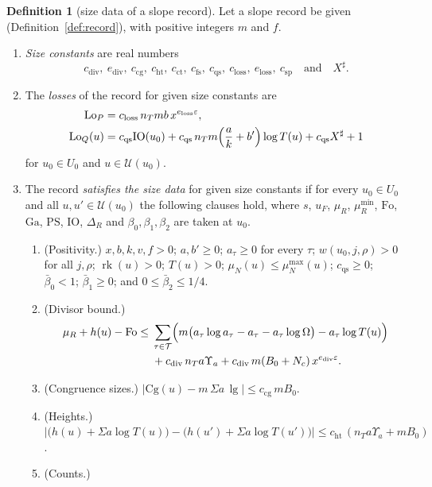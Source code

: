 \documentclass[11pt]{amsbook}
\theoremstyle{plain}
\theoremstyle{definition}
\newtheorem{definition}[theorem]{Definition}
\theoremstyle{remark}
\numberwithin{equation}{section}
\numberwithin{figure}{chapter}
\numberwithin{table}{chapter}
\newcommand{\eps}{\varepsilon}
\newcommand{\rk}{\operatorname{rk}}
\newcommand{\PS}{\mathrm{PS}}
\newcommand{\Top}{\mathcal{T}}
\newcommand{\Words}{\mathcal{U}}
\newcommand{\Cg}{\mathrm{Cg}}
\newcommand{\lgv}{\operatorname{lg}}
\newcommand{\Fo}{\mathrm{Fo}}
\newcommand{\Ga}{\mathrm{Ga}}
\newcommand{\IO}{\mathrm{IO}}
\newcommand{\Lo}{\mathrm{Lo}}
\begin{document}
\begin{definition}[size data of a slope record]\label{def:size-data}
Let a slope record be given (Definition~\ref{def:record}), with
positive integers $m$ and $f$.
\begin{enumerate}[label=(\arabic*)]
\item \emph{Size constants} are real numbers
\[
c_{\mathrm{div}},\ e_{\mathrm{div}},\ c_{\mathrm{cg}},\ c_{\mathrm{ht}},
\ c_{\mathrm{ct}},\ c_{\mathrm{fs}},\ c_{\mathrm{qs}},\
c_{\mathrm{loss}},\ e_{\mathrm{loss}},\ c_{\mathrm{sp}}\quad
\text{and}\quad X^\sharp.
\]
\item The \emph{losses} of the record for given size constants are
\[
\begin{aligned}
\Lo_P&=c_{\mathrm{loss}}\,n_Tmb\,x^{e_{\mathrm{loss}}\eps},\\
\Lo_Q(u)&=c_{\mathrm{qs}}\IO(u_0)+c_{\mathrm{qs}}\,n_Tm\Bigl(\frac ak+b'
\Bigr)\log T(u)+c_{\mathrm{qs}}X^\sharp+1
\end{aligned}
\]
for $u_0\in U_0$ and $u\in\Words(u_0)$.
\item The record \emph{satisfies the size data} for given size
constants if for every $u_0\in U_0$ and all $u,u'\in\Words(u_0)$ the
following clauses hold, where $s$, $u_F$, $\mu_R$, $\mu_R^{\min}$,
$\Fo$, $\Ga$, $\PS$, $\IO$, $\Delta_R$ and $\beta_0,\beta_1,\beta_2$
are taken at $u_0$.
\begin{enumerate}[label=(\roman*)]
\item\label{item:sd-pos}
(Positivity.) $x,b,k,v,f>0$; $a,b'\ge0$; $a_\tau\ge0$ for every
$\tau$; $w(u_0,j,\rho)>0$ for all $j,\rho$; $\rk(u)>0$; $T(u)>0$;
$\mu_N(u)\le\mu_N^{\max}(u)$; $c_{\mathrm{qs}}\ge0$; $\bar\beta_0<1$;
$\bar\beta_1\ge0$; and $0\le\bar\beta_2\le1/4$.
\item\label{item:sd-div} (Divisor bound.)
\[
\begin{aligned}
\mu_R+h(u)-\Fo\le{}&\sum_{\tau\in\Top}\Bigl(m\bigl(a_\tau\log
a_\tau-a_\tau-a_\tau\log\Omega\bigr)-a_\tau\log T(u)\Bigr)\\
&+c_{\mathrm{div}}\,n_Ta\Upsilon_a
+c_{\mathrm{div}}\,m(B_0+N_c)\,x^{e_{\mathrm{div}}\eps}.
\end{aligned}
\]
\item\label{item:sd-cg} (Congruence sizes.) $|\Cg(u)-m\,\Sigma a\,\lgv|\le
c_{\mathrm{cg}}\,mB_0$.
\item\label{item:sd-ht} (Heights.) $\bigl|\bigl(h(u)+\Sigma a\log T(u)\bigr)
-\bigl(h(u')+\Sigma a\log T(u')\bigr)\bigr|\le
c_{\mathrm{ht}}\,(n_Ta\Upsilon_a+mB_0)$.
\item\label{item:sd-ct} (Counts.)

\end{enumerate}
\end{enumerate}
\end{definition}
\end{document}
